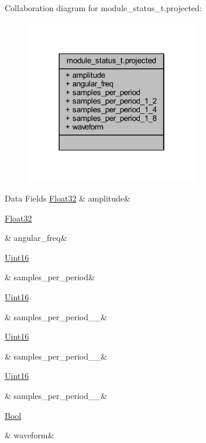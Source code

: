 Collaboration diagram for module\+\_\+status\+\_\+t.\+projected\+:\nopagebreak
\begin{figure}[H]
\begin{center}
\leavevmode
\includegraphics[width=214pt]{df/dbc/a00931}
\end{center}
\end{figure}
\begin{DoxyFields}{Data Fields}
\hypertarget{a00017_addbe18f9e817f99576a6b19f4ef7ea11}{\hyperlink{a00072_a87d38f886e617ced2698fc55afa07637}{Float32}}\label{a00017_addbe18f9e817f99576a6b19f4ef7ea11}
&
amplitude&
\\
\hline

\hypertarget{a00017_ac545c73a0cc0262b35237116428a056c}{\hyperlink{a00072_a87d38f886e617ced2698fc55afa07637}{Float32}}\label{a00017_ac545c73a0cc0262b35237116428a056c}
&
angular\+\_\+freq&
\\
\hline

\hypertarget{a00017_a74325e9c3b21529f768fbd60221ea39f}{\hyperlink{a00072_a59a9f6be4562c327cbfb4f7e8e18f08b}{Uint16}}\label{a00017_a74325e9c3b21529f768fbd60221ea39f}
&
samples\+\_\+per\+\_\+period&
\\
\hline

\hypertarget{a00017_add4662ab6e160d520e35022f19cdc3af}{\hyperlink{a00072_a59a9f6be4562c327cbfb4f7e8e18f08b}{Uint16}}\label{a00017_add4662ab6e160d520e35022f19cdc3af}
&
samples\+\_\+per\+\_\+period\+\_\+\_&
\\
\hline

\hypertarget{a00017_aeb19217c67e603ecd704ada2fb8e0cd0}{\hyperlink{a00072_a59a9f6be4562c327cbfb4f7e8e18f08b}{Uint16}}\label{a00017_aeb19217c67e603ecd704ada2fb8e0cd0}
&
samples\+\_\+per\+\_\+period\+\_\+\_&
\\
\hline

\hypertarget{a00017_a5b8ad6400f77e60b3a53917cc504a024}{\hyperlink{a00072_a59a9f6be4562c327cbfb4f7e8e18f08b}{Uint16}}\label{a00017_a5b8ad6400f77e60b3a53917cc504a024}
&
samples\+\_\+per\+\_\+period\+\_\+\_&
\\
\hline

\hypertarget{a00017_a7ef99e069cfb82cb0ab0aa517acc5481}{\hyperlink{a00072_a253b248072cfc8bd812c69acd0046eed}{Bool}}\label{a00017_a7ef99e069cfb82cb0ab0aa517acc5481}
&
waveform&
\\
\hline

\end{DoxyFields}


